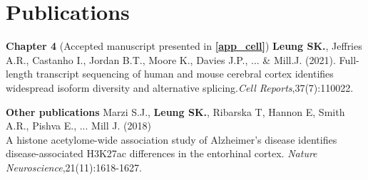 \chapter*{Publications}

\textbf{Chapter 4} 
\newline
(Accepted manuscript presented in \textbf{\cref{app_cell}})
\newline
\textbf{Leung SK.}, Jeffries A.R., Castanho I., Jordan B.T., Moore K., Davies J.P., ... \& Mill.J. (2021). Full-length transcript sequencing of human and mouse cerebral cortex identifies widespread isoform diversity and alternative splicing.\textit{Cell Reports},37(7):110022. 

\textbf{Other publications} 
\newline
Marzi S.J., \textbf{Leung SK.}, Ribarska T, Hannon E, Smith A.R., Pishva E., ... Mill J. (2018) \\ A histone acetylome-wide association study of Alzheimer's disease identifies disease-associated H3K27ac differences in the entorhinal cortex. \textit{Nature Neuroscience},21(11):1618-1627.
